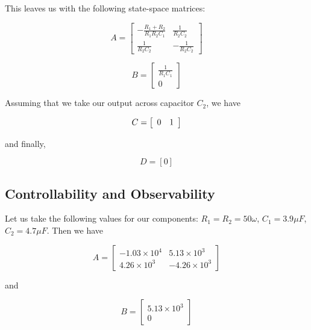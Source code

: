 \documentclass[a4paper, 12pt]{article}
\begin{document}
This leaves us with the following state-space matrices:

\begin{equation}
  A = \left[
  \begin{array}{cc}
    -\frac{R_1 + R_2}{R_1 R_2 C_1} & \frac{1}{R_2 C_2} \\
    \frac{1}{R_2 C_2} & -\frac{1}{R_2 C_2}
  \end{array}
  \right]
  \label{eq:ss_A}
\end{equation}

\begin{equation}
  B = \left[
  \begin{array}{c}
    \frac{1}{R_1 C_1} \\
    0
  \end{array}
  \right]
  \label{eq:ss_B}
\end{equation}

Assuming that we take our output across capacitor $C_2$, we have

\begin{equation}
  C = \left[
  \begin{array}{c c}
    0 & 1
  \end{array}
  \right]
  \label{eq:ss_C}
\end{equation}

and finally,

\begin{equation}
  D = \left[ 0 \right]
  \label{eq:ss_D}
\end{equation}

\subsection{Controllability and Observability}

Let us take the following values for our components: $R_1 = R_2 = 50\omega$,
$C_1 = 3.9 \mu F$, $C_2 = 4.7 \mu F$. Then we have

\begin{equation}
  A = \left[
  \begin{array}{cc}
    -1.03 \times 10^4 & 5.13 \times 10^3 \\
    4.26 \times 10^3 & -4.26 \times 10^3
  \end{array}
  \right]
  \label{eq:q_A}
\end{equation}

\noindent and

\begin{equation}
  B = \left[
  \begin{array}{c}
    5.13 \times 10^3 \\
    0
  \end{array}
  \right]
  \label{eq:q_B}
\end{equation}
\end{document}
